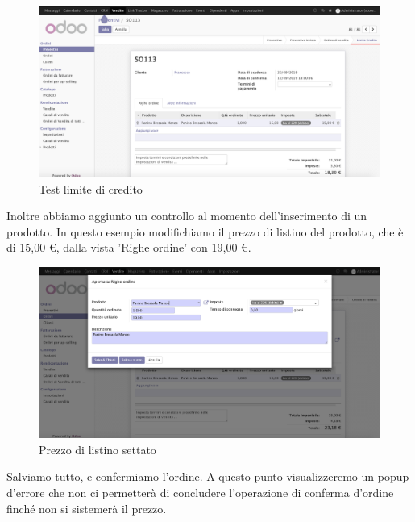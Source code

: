 \begin{figure}[H]
	\begin{center} \includegraphics[scale=0.3]{figures/second_test}
		\caption[Test limite di credito]{Test limite di credito}
		\label{fig:second_test}
	\end{center}
\end{figure}
\newpage
Inoltre abbiamo aggiunto un controllo al momento dell'inserimento di un prodotto.
In questo esempio modifichiamo il prezzo di listino del prodotto, che è di 15,00 €, dalla vista 'Righe ordine' con 19,00 €.
\begin{figure}[H]
	\begin{center} \includegraphics[scale=0.3]{figures/list_price}
		\caption[Prezzo di listino settato]{Prezzo di listino settato}
		\label{fig:list_price}
	\end{center}
\end{figure}
\newpage
Salviamo tutto, e confermiamo l'ordine. A questo punto visualizzeremo un popup d'errore che non ci permetterà di concludere l'operazione di conferma d'ordine finché non si sistemerà il prezzo.
